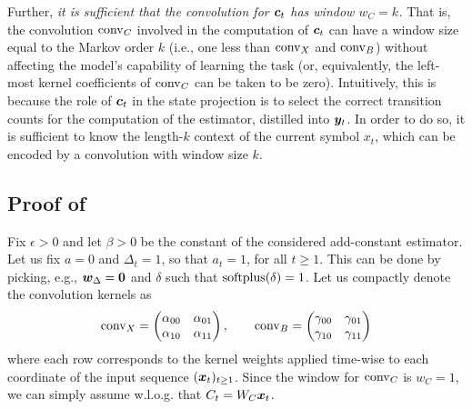 Further, \emph{it is sufficient that the convolution for $\boldsymbol{c}_t$ has window $w_C = k$.} That is, the convolution $\mathrm{conv}_C$ involved in the computation of $\boldsymbol{c}_t$ can have a window size equal to the Markov order $k$ (i.e., one less than $\mathrm{conv}_X$ and $\mathrm{conv}_B$) without affecting the model's capability of learning the task (or, equivalently, the left-most kernel coefficients of $\mathrm{conv}_C$ can be taken to be zero). Intuitively, this is because the role of $\boldsymbol{c}_t$ in the state projection is to select the correct transition counts for the computation of the estimator, distilled into $\boldsymbol{y}_t$. In order to do so, it is sufficient to know the length-$k$ context of the current symbol $x_t$, which can be encoded by a convolution with window size $k$.


\subsection{Proof of }
\label{sec:actual_proof1}
Fix $\epsilon > 0$ and let $\beta > 0$ be the constant of the considered add-constant estimator. Let us fix $a=0$ and $\Delta_t = 1$, so that $a_t = 1$, for all $t\geq 1$. This can be done by picking, e.g., $\boldsymbol{w}_{\Delta} = \boldsymbol{0}$ and $\delta$ such that $\mathrm{softplus}(\delta) = 1$. Let us compactly denote the convolution kernels as
\begin{equation}
\mathrm{conv}_X = \begin{pmatrix}
    \alpha_{00} &\alpha_{01} \\
    \alpha_{10} &\alpha_{11}
\end{pmatrix}, \qquad
\mathrm{conv}_B = \begin{pmatrix}
    \gamma_{00} &\gamma_{01} \\
    \gamma_{10} &\gamma_{11}
\end{pmatrix}
\end{equation}
where each row corresponds to the kernel weights applied time-wise to each coordinate of the input sequence $(\boldsymbol{x}_t)_{t\geq 1}$. Since the window for $\mathrm{conv}_C$ is $w_C = 1$, we can simply assume w.l.o.g. that $C_t = W_C \boldsymbol{x}_t$. 

